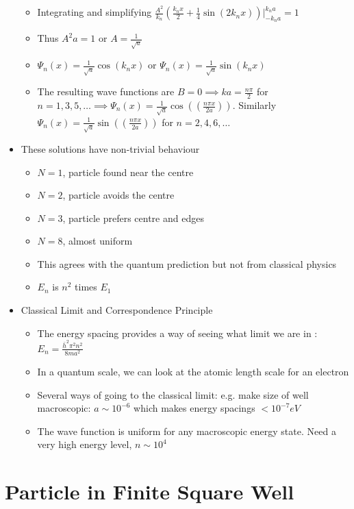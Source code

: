 \documentclass[12pt]{article}
\begin{document}
\begin{itemize}
\begin{itemize}
        \item Integrating and simplifying $\frac{A^2}{k_n} (\frac{k_nx}{2} + \frac{1}{4} \sin (2 k_n x)) |_{-k_n a}^{k_n a} = 1$
        \item Thus $A^2 a = 1$ or $A = \frac{1}{\sqrt{a}}$
        \item $\varPsi_n(x) = \frac{1}{\sqrt{a}} \cos(k_n x)$ or $\varPsi_n(x) = \frac{1}{\sqrt{a}} \sin(k_n x)$ 
        \item The resulting wave functions are $B = 0 \implies ka = \frac{n \pi}{2}$ for $n = 1,3,5,\dots \implies \varPsi_n(x) = \frac{1}{\sqrt{a}} \cos ((\frac{n \pi x}{2a}))$. Similarly $\varPsi_n(x) = \frac{1}{\sqrt{a}} \sin ((\frac{n \pi x}{2a}))$ for $n = 2,4,6, \dots$
    \end{itemize}
    \item These solutions have non-trivial behaviour \begin{itemize}
        \item $N=1$, particle found near the centre
        \item $N=2$, particle avoids the centre
        \item $N=3$, particle prefers centre and edges
        \item $N = 8$, almost uniform
        \item This agrees with the quantum prediction but not from classical physics
        \item $E_n$ is $n^2$ times $E_1$
    \end{itemize}
    \item Classical Limit and Correspondence Principle \begin{itemize}
        \item The energy spacing provides a way of seeing what limit we are in :$E_n = \frac{\bar{h}^2 \pi^2 n^2}{8 ma^2}$
        \item In a quantum scale, we can look at the atomic length scale for an electron 
        \item Several ways of going to the classical limit: e.g. make size of well macroscopic: $a \sim 10^{-6}$ which makes energy spacings $< 10^{-7} eV$
        \item The wave function is uniform for any macroscopic energy state. Need a very high energy level, $n \sim 10^4$
    \end{itemize}
\end{itemize}

\section{Particle in Finite Square Well}
\end{document}
